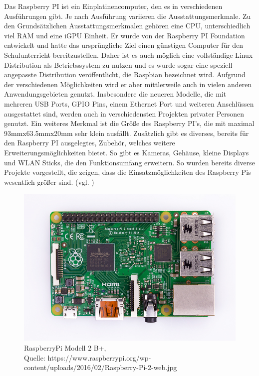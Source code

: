 \documentclass[ngerman]{scrartcl} %
\begin{document}
Das Raspberry PI ist ein Einplatinencomputer, den es in verschiedenen Ausführungen gibt. Je nach Ausführung variieren die Ausstattungsmerkmale. Zu den Grundsätzlichen Ausstattungsmerkmalen gehören eine CPU, unterschiedlich viel RAM und eine iGPU Einheit. Er wurde von der Raspberry PI Foundation entwickelt und hatte das ursprüngliche Ziel einen günstigen Computer für den Schulunterricht bereitzustellen. Daher ist es auch möglich eine vollständige Linux Distribution als Betriebssystem zu nutzen und es wurde sogar eine speziell angepasste Distribution veröffentlicht, die Raspbian bezeichnet wird. 
Aufgrund der verschiedenen Möglichkeiten wird er aber mittlerweile auch in vielen anderen Anwendungsgebieten genutzt. Insbesondere die neueren Modelle, die mit mehreren USB Ports, GPIO Pins, einem Ethernet Port und weiteren Anschlüssen ausgestattet sind, werden auch in verschiedensten Projekten privater Personen genutzt. Ein weiteres Merkmal ist die Größe des Raspberry PI's, die mit maximal 93mmx63.5mmx20mm sehr klein ausfällt. Zusätzlich gibt es diverses, bereits für den Raspberry PI ausgelegtes, Zubehör, welches weitere Erweiterungsmöglichkeiten bietet. So gibt es Kameras, Gehäuse, kleine Displays und WLAN Sticks, die den Funktionsumfang erweitern. So wurden bereits diverse Projekte vorgestellt, die zeigen, dass die Einsatzmöglichkeiten des Raspberry Pis wesentlich größer sind. (vgl. \cite{.28.12.2016} \cite{.28.01.2017})
\\
\begin{figure}[!htb]
	\centering
	\includegraphics[scale=0.5]{Raspberry-Pi-2-web.png}
	\caption[RaspberryPi Modell 2 B]{RaspberryPi Modell 2 B+,\\ Quelle: https://www.raspberrypi.org/wp-content/uploads/2016/02/Raspberry-Pi-2-web.jpg}
\end{figure}
\end{document}
